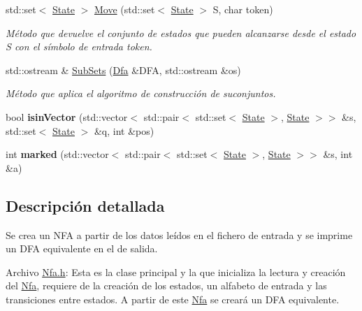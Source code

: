 \begin{DoxyCompactItemize}
std\+::set$<$ \hyperlink{classState}{State} $>$ \hyperlink{classNfa_a13e99ae74bbd1172e9502c5218b24616}{Move} (std\+::set$<$ \hyperlink{classState}{State} $>$ S, char token)
\begin{DoxyCompactList}\small\item\em Método que devuelve el conjunto de estados que pueden alcanzarse desde el estado S con el símbolo de entrada token. \end{DoxyCompactList}\item 
std\+::ostream \& \hyperlink{classNfa_a76d0f776ed9fa7d291c387db466369c3}{Sub\+Sets} (\hyperlink{classDfa}{Dfa} \&D\+FA, std\+::ostream \&os)
\begin{DoxyCompactList}\small\item\em Método que aplica el algoritmo de construcción de suconjuntos. \end{DoxyCompactList}\item 
\mbox{\label{classNfa_a69a998ea2212906f5f4fe202b343d0c5}} 
bool {\bfseries isin\+Vector} (std\+::vector$<$ std\+::pair$<$ std\+::set$<$ \hyperlink{classState}{State} $>$, \hyperlink{classState}{State} $>$$>$ \&s, std\+::set$<$ \hyperlink{classState}{State} $>$ \&q, int \&pos)
\item 
\mbox{\label{classNfa_ade95a77c0d7b86487cf98a3b3e577275}} 
int {\bfseries marked} (std\+::vector$<$ std\+::pair$<$ std\+::set$<$ \hyperlink{classState}{State} $>$, \hyperlink{classState}{State} $>$$>$ \&s, int \&a)
\end{DoxyCompactItemize}


\subsection{Descripción detallada}
Se crea un N\+FA a partir de los datos leídos en el fichero de entrada y se imprime un D\+FA equivalente en el de salida. 

Archivo \hyperlink{Nfa_8h_source}{Nfa.\+h}\+: Esta es la clase principal y la que inicializa la lectura y creación del \hyperlink{classNfa}{Nfa}, requiere de la creación de los estados, un alfabeto de entrada y las transiciones entre estados. A partir de este \hyperlink{classNfa}{Nfa} se creará un D\+FA equivalente.

